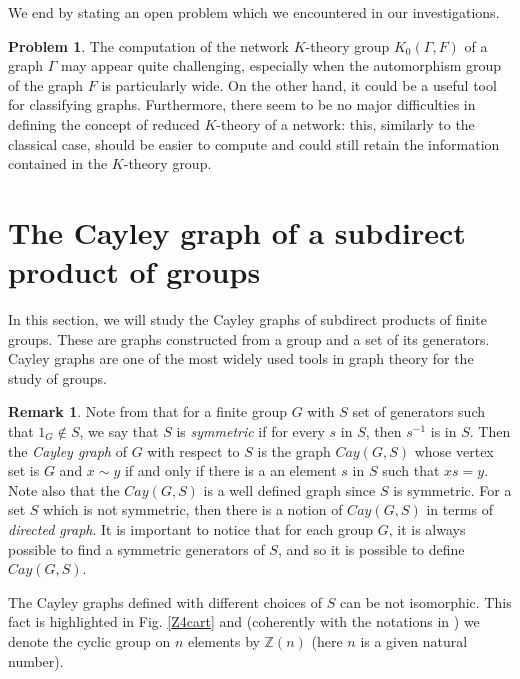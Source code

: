 \documentclass{amsart}
\theoremstyle{definition}
\newtheorem{rem}[theo]{Remark}
\newtheorem{problem}[theo]{Problem}
\numberwithin{equation}{section}
\begin{document}
We end by stating an open problem which we encountered in our investigations.

\begin{problem}
    The computation of the network $K$-theory group $K_0(\Gamma, F)$ of a graph $\Gamma$ may appear quite challenging,  especially when the automorphism group of the graph $F$ is particularly wide. On the other hand, it could be a useful tool for classifying graphs. Furthermore, there seem to be no major difficulties in defining the concept of reduced $K$-theory of a network: this, similarly to the classical case, should be easier to compute and could still retain the information contained in the $K$-theory group.
\end{problem}


\section{The Cayley graph of a subdirect product of groups}\label{section5}
In this section, we will study the Cayley graphs of subdirect products of finite groups. These are graphs constructed from a group and a set of its generators. Cayley graphs are one of the most widely used tools in graph theory for the study of groups.

\begin{rem}
Note from \cite{bddr, spectrabook, crs, gross2} that for a finite group $G$ with $S$ set of generators such that $1_G \notin S$, we say that $S$ is  \textit{symmetric} if for every $s$ in $S$, then $s^{-1}$ is in $S$. Then the \textit{Cayley graph} of $G$ with respect to $S$ is the graph $Cay(G,S)$ whose vertex set is $G$ and $x \sim y$ if and only if there is a an element $s$ in $S$ such that $xs = y$. Note also that the $Cay(G,S)$ is a well defined graph since $S$ is symmetric. For a set $S$ which is not symmetric, then there is a notion of $Cay(G,S)$ in terms of  \textit{directed graph}. It is important to notice that for each group $G$, it is always possible to find a symmetric generators of $S$, and so it is possible to define $Cay(G, S)$. 
\end{rem}

The Cayley graphs defined with different choices of $S$ can be not isomorphic. This fact is highlighted in Fig. \ref{Z4cart} and (coherently with the notations in \cite{bbr1, b, bddr, hofmor}) we denote the cyclic group  on $n$ elements by $\mathbb{Z}(n)$ (here $n$ is a given natural number).
\end{document}
